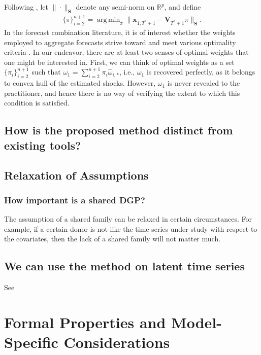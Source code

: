 \documentclass[11pt]{article}
\newcommand{\V}{\textbf{V}}
\newcommand{\weight}{\pi}
\newcommand{\x}{\textbf{x}}
\DeclareMathOperator*{\argmin}{arg\,min} %
\theoremstyle{definition}
\begin{document}
    Following \citet{abadie2003economic,abadie2010synthetic,lin2021minimizing}, let $\|\cdot\|_{\textbf{S}}$ denote any semi-norm on $\mathbb{R}^{p}$, and define
    \begin{align*}
    \{\pi\}_{i=2}^{n+1} = \argmin_{\pi}\|\x_{1,T^* + 1} - \V_{T^* + 1}\pi\|_{\textbf{S}}. 
    \end{align*}
In the forecast combination literature, it is of interest whether the weights employed to aggregate forecasts strive toward and meet various optimality criteria \citep{timmermann2006forecast,wang2023forecast}.  In our endeavor, there are at least two senses of optimal weights that one might be interested in.  First, we can think of optimal weights as a set $\{\weight_{i}\}_{i=2}^{n+1}$ such that $\omega_{1} = \sum^{n+1}_{i=2}\weight_{i}\hat\omega_{i,*}$, i.e., $\omega_{1}$ is recovered perfectly, as it belongs to convex hull of the estimated shocks. However, $\omega_{1}$ is never revealed to the practitioner, and hence there is no way of verifying the extent to which this condition is satisfied.

    
\subsection{How is the proposed method distinct from existing tools?}

\subsection{Relaxation of Assumptions}
\subsubsection{How important is a shared DGP?}

The assumption of a shared family can be relaxed in certain circumstances.  For example, if a certain donor is not like the time series under study with respect to the covariates, then the lack of a shared family will not matter much.
\subsection{We can use the method on latent time series}
See \cite{lundquist2024volatility}

\section{Formal Properties and Model-Specific Considerations}\label{special_cases}
\end{document}
